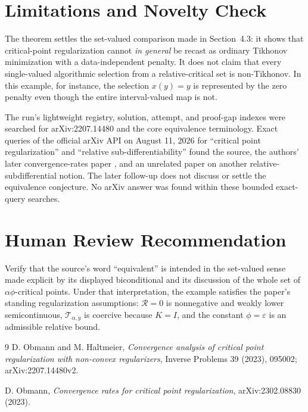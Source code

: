\documentclass[11pt]{article}
\begin{document}
\section*{Limitations and Novelty Check}

The theorem settles the set-valued comparison made in Section~4.3: it shows
that critical-point regularization cannot \emph{in general} be recast as
ordinary Tikhonov minimization with a data-independent penalty. It does not
claim that every single-valued algorithmic selection from a relative-critical
set is non-Tikhonov. In this example, for instance, the selection \(x(y)=y\)
is represented by the zero penalty even though the entire interval-valued map
is not.

The run's lightweight registry, solution, attempt, and proof-gap indexes were
searched for arXiv:2207.14480 and the core equivalence terminology. Exact
queries of the official arXiv API on August 11, 2026 for ``critical point
regularization'' and ``relative sub-differentiability'' found the source, the
authors' later convergence-rates paper \cite{O2023}, and an unrelated paper on
another relative-subdifferential notion. The later follow-up does not discuss
or settle the equivalence conjecture. No arXiv answer was found within these
bounded exact-query searches.

\section*{Human Review Recommendation}

Verify that the source's word ``equivalent'' is intended in the set-valued
sense made explicit by its displayed biconditional and its discussion of the
whole set of \(\alpha\phi\)-critical points. Under that interpretation, the
example satisfies the paper's standing regularization assumptions:
\(\mathcal R=0\) is nonnegative and weakly lower semicontinuous,
\(\mathcal T_{\alpha,y}\) is coercive because \(K=I\), and the constant
\(\phi=\varepsilon\) is an admissible relative bound.

\begin{thebibliography}{9}
D. Obmann and M. Haltmeier,
\emph{Convergence analysis of critical point regularization with non-convex
regularizers}, Inverse Problems 39 (2023), 095002;
arXiv:2207.14480v2.

D. Obmann,
\emph{Convergence rates for critical point regularization},
arXiv:2302.08830 (2023).
\end{thebibliography}
\end{document}
